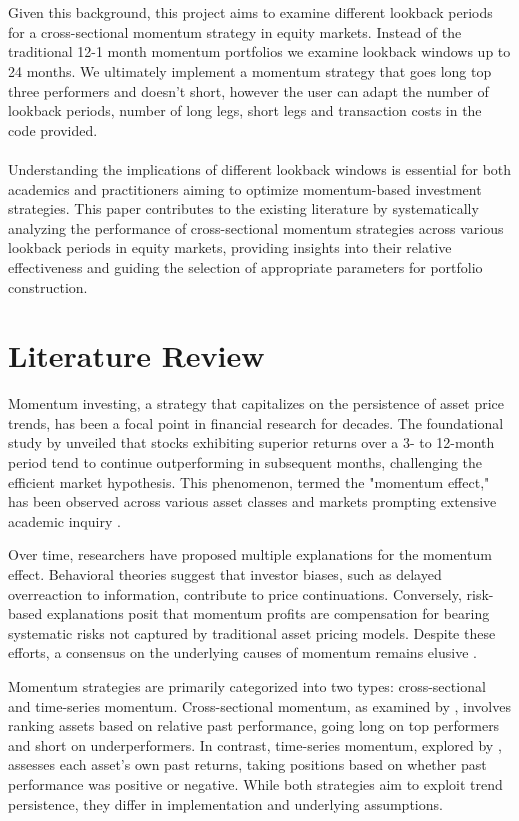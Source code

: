 \documentclass[a4paper,12pt,twoside]{article}
\begin{document}
\\~\\
Given this background, this project aims to examine different lookback periods for a cross-sectional momentum strategy in equity markets. Instead of the traditional 12-1 month momentum portfolios we examine lookback windows up to 24 months. We ultimately implement a momentum strategy that goes long top three performers and doesn't short, however the user can adapt the number of lookback periods, number of long legs, short legs and transaction costs in the code provided.
\\~\\
Understanding the implications of different lookback windows is essential for both academics and practitioners aiming to optimize momentum-based investment strategies. This paper contributes to the existing literature by systematically analyzing the performance of cross-sectional momentum strategies across various lookback periods in equity markets, providing insights into their relative effectiveness and guiding the selection of appropriate parameters for portfolio construction.
\newpage
\section{Literature Review}
Momentum investing, a strategy that capitalizes on the persistence of asset price trends, has been a focal point in financial research for decades. The foundational study by \cite{jegadeesh1993returns} unveiled that stocks exhibiting superior returns over a 3- to 12-month period tend to continue outperforming in subsequent months, challenging the efficient market hypothesis. This phenomenon, termed the "momentum effect," has been observed across various asset classes and markets prompting extensive academic inquiry \citep{asness2013value, baltas2013momentum}.

Over time, researchers have proposed multiple explanations for the momentum effect. Behavioral theories suggest that investor biases, such as delayed overreaction to information, contribute to price continuations. Conversely, risk-based explanations posit that momentum profits are compensation for bearing systematic risks not captured by traditional asset pricing models. Despite these efforts, a consensus on the underlying causes of momentum remains elusive \citep{barberis1998model, grinblatt2005prospect, bikhchandani1992theory}.

Momentum strategies are primarily categorized into two types: cross-sectional and time-series momentum. Cross-sectional momentum, as examined by \cite{jegadeesh1993returns}, involves ranking assets based on relative past performance, going long on top performers and short on underperformers. In contrast, time-series momentum, explored by \cite{moskowitz2012time}, assesses each asset's own past returns, taking positions based on whether past performance was positive or negative. While both strategies aim to exploit trend persistence, they differ in implementation and underlying assumptions.
\end{document}
